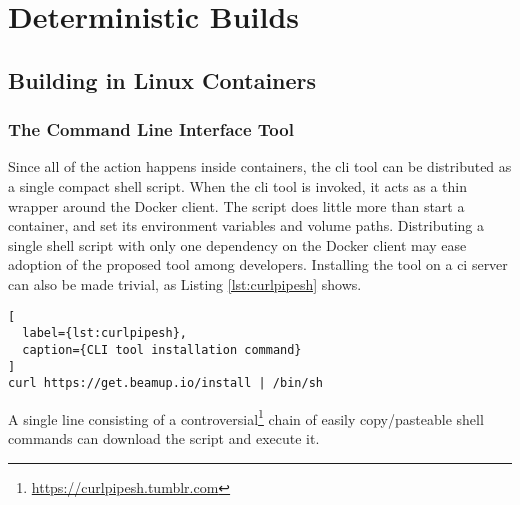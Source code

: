 \section{Deterministic Builds}

\subsection{Building in Linux Containers}

\subsubsection{The Command Line Interface Tool}
Since all of the action happens inside containers, the \acrshort{cli} tool can be distributed as a single compact shell script. When the \acrshort{cli} tool is invoked, it acts as a thin wrapper around the Docker client. The script does little more than start a container, and set its environment variables and volume paths. Distributing a single shell script with only one dependency on the Docker client may ease adoption of the proposed tool among developers. Installing the tool on a \acrshort{ci} server can also be made trivial, as Listing \ref{lst:curlpipesh} shows.

\begin{lstlisting}[
  label={lst:curlpipesh},
  caption={CLI tool installation command}
]
curl https://get.beamup.io/install | /bin/sh
\end{lstlisting}

A single line consisting of a controversial\footnote{\url{https://curlpipesh.tumblr.com}} chain of easily copy/pasteable shell commands can download the script and execute it.

